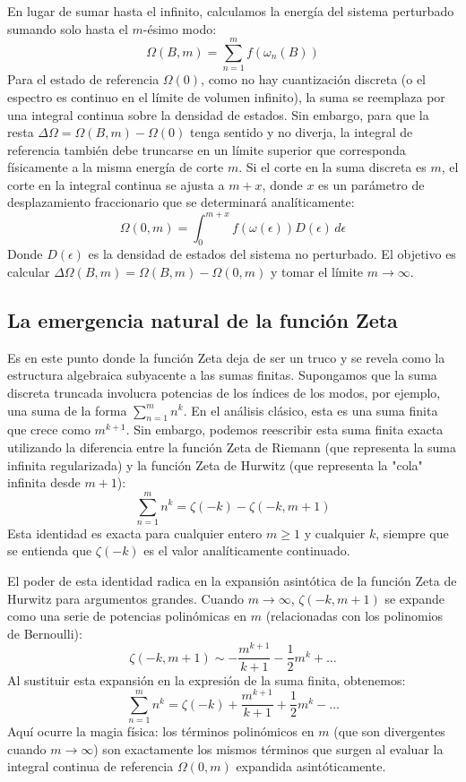 En lugar de sumar hasta el infinito, calculamos la energía del sistema perturbado sumando solo hasta el $m$-ésimo modo:
$$ \Omega(B, m) = \sum_{n=1}^{m} f(\omega_n(B)) $$
Para el estado de referencia $\Omega(0)$, como no hay cuantización discreta (o el espectro es continuo en el límite de volumen infinito), la suma se reemplaza por una integral continua sobre la densidad de estados. Sin embargo, para que la resta $\Delta \Omega = \Omega(B, m) - \Omega(0)$ tenga sentido y no diverja, la integral de referencia también debe truncarse en un límite superior que corresponda físicamente a la misma energía de corte $m$. Si el corte en la suma discreta es $m$, el corte en la integral continua se ajusta a $m+x$, donde $x$ es un parámetro de desplazamiento fraccionario que se determinará analíticamente:
$$ \Omega(0, m) = \int_{0}^{m+x} f(\omega(\epsilon)) D(\epsilon) \, d\epsilon $$
Donde $D(\epsilon)$ es la densidad de estados del sistema no perturbado. El objetivo es calcular $\Delta \Omega(B, m) = \Omega(B, m) - \Omega(0, m)$ y tomar el límite $m \to \infty$.

\subsection{La emergencia natural de la función Zeta}

Es en este punto donde la función Zeta deja de ser un truco y se revela como la estructura algebraica subyacente a las sumas finitas. Supongamos que la suma discreta truncada involucra potencias de los índices de los modos, por ejemplo, una suma de la forma $\sum_{n=1}^{m} n^k$. En el análisis clásico, esta es una suma finita que crece como $m^{k+1}$. Sin embargo, podemos reescribir esta suma finita exacta utilizando la diferencia entre la función Zeta de Riemann (que representa la suma infinita regularizada) y la función Zeta de Hurwitz (que representa la "cola" infinita desde $m+1$):
$$ \sum_{n=1}^{m} n^k = \zeta(-k) - \zeta(-k, m+1) $$
Esta identidad es exacta para cualquier entero $m \ge 1$ y cualquier $k$, siempre que se entienda que $\zeta(-k)$ es el valor analíticamente continuado. 

El poder de esta identidad radica en la expansión asintótica de la función Zeta de Hurwitz para argumentos grandes. Cuando $m \to \infty$, $\zeta(-k, m+1)$ se expande como una serie de potencias polinómicas en $m$ (relacionadas con los polinomios de Bernoulli):
$$ \zeta(-k, m+1) \sim -\frac{m^{k+1}}{k+1} - \frac{1}{2}m^k + \dots $$
Al sustituir esta expansión en la expresión de la suma finita, obtenemos:
$$ \sum_{n=1}^{m} n^k = \zeta(-k) + \frac{m^{k+1}}{k+1} + \frac{1}{2}m^k - \dots $$
Aquí ocurre la magia física: los términos polinómicos en $m$ (que son divergentes cuando $m \to \infty$) son exactamente los mismos términos que surgen al evaluar la integral continua de referencia $\Omega(0, m)$ expandida asintóticamente. 

